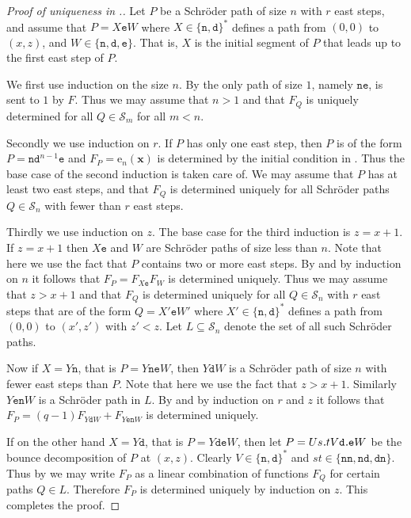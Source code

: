 \documentclass[reqno]{amsart}
\newcommand{\xvec}{\mathbf{x}}
\newcommand{\estep}{\texttt{e}}
\newcommand{\dstep}{\texttt{d}}
\newcommand{\nstep}{\texttt{n}}
\newcommand{\bs}{{\kern-.08em\texttt{.}\kern-.13em}} %
\newcommand{\elementaryE}{\mathrm{e}}
\newcommand{\SCH}[1]{\mathcal{S}_{#1}}     %
\begin{document}
\begin{proof}[Proof of uniqueness in .]
Let $P$ be a Schr{\"o}der path of size $n$ with $r$ east steps, and 
assume that $P=X\estep W$ where $X\in\{\nstep,\dstep\}^{*}$ defines 
a path from $(0,0)$ to $(x,z)$, and $W\in\{\nstep,\dstep,\estep\}$.
That is, $X$ is the initial segment of $P$ that leads up to the first east step of $P$.

We first use induction on the size $n$.
By  the only path of size $1$, namely $\nstep\estep$, is sent to $1$ by $F$.
Thus we may assume that $n>1$ and that $F_Q$ is 
uniquely determined for all $Q\in\SCH{m}$ for all $m<n$.

Secondly we use induction on $r$.
If $P$ has only one east step, then $P$ is of the 
form $P=\nstep\dstep^{n-1}\estep$ and $F_P=\elementaryE_{n}(\xvec)$ is 
determined by the initial condition in .
Thus the base case of the second induction is taken care of.
We may assume that $P$ has at least two east steps, and that $F_Q$ 
is determined uniquely for all Schr{\"o}der paths $Q\in\SCH{n}$ with fewer than $r$ east steps.

Thirdly we use induction on $z$.
The base case for the third induction is $z=x+1$.
If $z=x+1$ then $X\estep$ and $W$ are Schr{\"o}der paths of size less than $n$.
Note that here we use the fact that $P$ contains two or more east steps. 
By  and by induction on $n$ it follows that $F_P=F_{X\estep}F_W$ is determined uniquely.
Thus we may assume that $z>x+1$ and that $F_Q$ is determined uniquely 
for all $Q\in\SCH{n}$ with $r$ east steps that are of the form $Q=X'\estep W'$ 
where $X'\in\{\nstep,\dstep\}^*$ defines a path from $(0,0)$ to $(x',z')$ with $z'<z$.
Let $L\subseteq\SCH{n}$ denote the set of all such Schr{\"o}der paths.

Now if $X=Y\nstep$, that is $P=Y\nstep\estep W$, then $Y\dstep W$ 
is a Schr{\"o}der path of size $n$ with fewer east steps than $P$.
Note that here we use the fact that $z>x+1$.
Similarly $Y\estep\nstep W$ is a Schr{\"o}der path in $L$.
By  and by induction on $r$ and $z$ it follows that $F_P=(q-1)F_{Y\dstep W}+F_{Y\estep\nstep W}$ is determined uniquely.

If on the other hand $X=Y\dstep$, that is $P=Y\dstep\estep W$, 
then let $P=Us\bs tV\dstep\bs\estep W$ be the bounce decomposition of $P$ at $(x,z)$.
Clearly $V\in\{\nstep,\dstep\}^*$ and $st\in\{\nstep\nstep,\nstep\dstep,\dstep\nstep\}$.
Thus by  we may write $F_P$ as a linear 
combination of functions $F_Q$ for certain paths $Q\in L$.
Therefore $F_P$ is determined uniquely by induction on $z$.
This completes the proof.
\end{proof}
\end{document}

